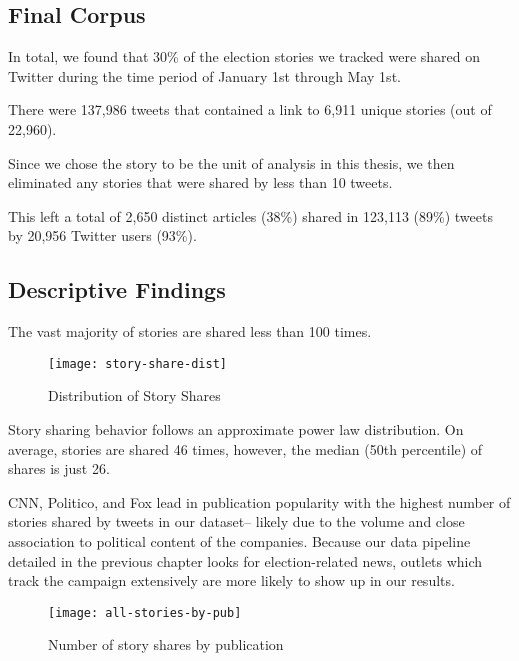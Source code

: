 \subsection{Final Corpus}

In total, we found that 30\% of the election stories we tracked were shared on Twitter during the time period of January 1st through May 1st.

There were 137,986 tweets that contained a link to 6,911 unique stories (out of 22,960).

Since we chose the story to be the unit of analysis in this thesis, we then eliminated any stories that were shared by less than 10 tweets.

This left a total of 2,650 distinct articles (38\%) shared in 123,113 (89\%) tweets by 20,956 Twitter users (93\%).

\subsection{Descriptive Findings}
The vast majority of stories are shared less than 100 times. 

\begin{figure}[H]  
\centering 
  \texttt{[image: story-share-dist]}  
  \caption{Distribution of Story Shares
    \label{fig:story-share-dist}}
\end{figure} 

Story sharing behavior follows an approximate power law distribution. On average, stories are shared 46 times, however, the median (50th percentile) of shares is just 26. 


CNN, Politico, and Fox lead in publication popularity with the highest number of stories shared by tweets in our dataset-- likely due to the volume and close association to political content of the companies. Because our data pipeline detailed in the previous chapter looks for election-related news, outlets which track the campaign extensively are more likely to show up in our results.


\begin{figure}[H]  
\centering 
  \texttt{[image: all-stories-by-pub]}  
  \caption{Number of story shares by publication
    \label{fig:tweets-by-pub}}
\end{figure} 


\newpage %

